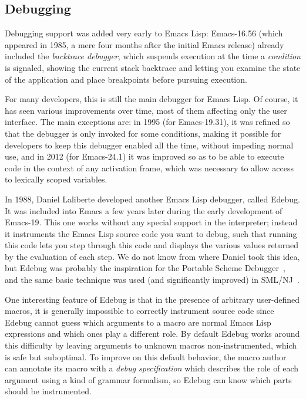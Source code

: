 \documentclass[format=acmsmall, review]{acmart}
\newcommand \Elisp {Emacs Lisp}
\begin{document}
\subsection{Debugging}
\label{sec:debugger}

Debugging support was added very early to \Elisp: Emacs-16.56 (which
appeared in 1985, a mere four months after the initial Emacs release) already
included the \emph{backtrace debugger}, which suspends execution at the time
a \emph{condition} is signaled, showing the current stack backtrace and
letting you examine the state of the application and place breakpoints
before pursuing execution.

For many developers, this is still the main debugger for \Elisp{}.
Of course, it has seen various improvements over time, most of them
affecting only the user interface.  The main exceptions are:
in 1995 (for Emacs-19.31), it was refined so that the debugger is only
invoked for some conditions, making it possible for developers to keep this
debugger enabled all the time, without impeding normal use, and in 2012
(for Emacs-24.1) it was improved so as to be able to execute code in the
context of any activation frame, which was necessary to allow access to
lexically scoped variables.

In 1988, Daniel Laliberte developed another \Elisp{} debugger, called
Edebug.  It was included into Emacs a few years later during the early
development of Emacs-19.  This one works without any special support in the
interpreter; instead it instruments the \Elisp{} source code you want to
debug, such that running this code lets you step through this code and
displays the various values returned by the evaluation of each step.  We do
not know from where Daniel took this idea, but Edebug was probably the
inspiration for the Portable Scheme Debugger~\cite{Kellomaki93}, and the
same basic technique was used (and significantly improved) in
SML/NJ~\cite{Tolmach90}.

One interesting feature of Edebug is that in the presence of arbitrary
user-defined macros, it is generally impossible to correctly instrument
source code since Edebug cannot guess which arguments to a macro are normal
\Elisp{} expressions and which ones play a different role.  By default
Edebug works around this difficulty by leaving arguments to unknown macros
non-instrumented, which is safe but suboptimal.  To improve on this default
behavior, the macro author can annotate its macro with a \emph{debug
  specification} which describes the role of each argument using a kind of
grammar formalism, so Edebug can know which parts should be
instrumented.
\end{document}
